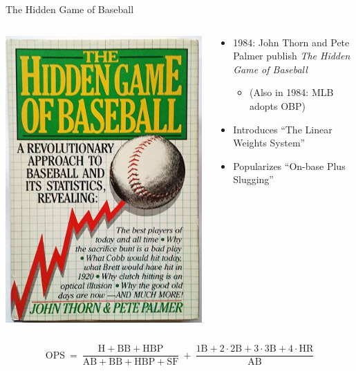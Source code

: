 \documentclass[handout]{beamer}
\begin{document}
\begin{frame}{The Hidden Game of Baseball}
  \begin{columns}
    \begin{column}{0.3\textwidth}
      \includegraphics[width = \textwidth]{images/hidden_game.jpg}
    \end{column}
    \begin{column}{0.7\textwidth}
      \begin{itemize}
        \item 1984: John Thorn and Pete Palmer publish {\it The Hidden Game of Baseball}
        \begin{itemize}
          \item (Also in 1984: MLB adopts OBP)
        \end{itemize}
        \pause
        \item Introduces ``The Linear Weights System''
        \pause
        \item Popularizes ``On-base Plus Slugging''
      \end{itemize}
    \end{column}
  \end{columns}
  $$
    \mbox{OPS}~=~\frac{\mbox{H} + \mbox{BB} + \mbox{HBP}}{\mbox{AB} + \mbox{BB} + \mbox{HBP} + \mbox{SF}}~+~\frac{\mbox{1B} + 2 \cdot \mbox{2B} + 3 \cdot \mbox{3B} + 4 \cdot \mbox{HR}}{\mbox{AB}}
  $$
\end{frame}
\end{document}
